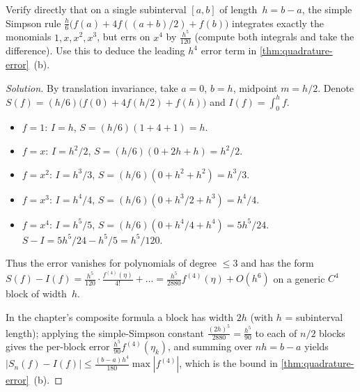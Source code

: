 \begin{problem}
\label{prob:simpson-precision}
Verify directly that on a single subinterval $[a, b]$ of length~$h = b - a$,
the simple Simpson rule
$\tfrac{h}{6}\bigl(f(a) + 4 f((a + b)/2) + f(b)\bigr)$ integrates
exactly the monomials $1, x, x^2, x^3$, but errs on $x^4$ by
$\tfrac{h^5}{120}$ (compute both integrals and take the difference).
Use this to deduce the leading $h^4$ error term in
\cref{thm:quadrature-error}~(b).
\end{problem}

\begin{proof}[Solution]
By translation invariance, take $a = 0$, $b = h$, midpoint $m = h/2$.
Denote $S(f) = (h/6)\bigl(f(0) + 4 f(h/2) + f(h)\bigr)$ and
$I(f) = \int_0^h f$.
\begin{itemize}
  \item $f = 1$: $I = h$, $S = (h/6)(1 + 4 + 1) = h$.
  \item $f = x$: $I = h^2/2$, $S = (h/6)(0 + 2 h + h) = h^2/2$.
  \item $f = x^2$: $I = h^3/3$, $S = (h/6)(0 + h^2 + h^2) = h^3/3$.
  \item $f = x^3$: $I = h^4/4$, $S = (h/6)(0 + h^3/2 + h^3) = h^4/4$.
  \item $f = x^4$: $I = h^5/5$, $S = (h/6)(0 + h^4/4 + h^4) = 5 h^5/24$.
        $S - I = 5 h^5/24 - h^5/5 = h^5/120$.
\end{itemize}
Thus the error vanishes for polynomials of degree $\le 3$ and has the
form $S(f) - I(f) = \tfrac{h^5}{120} \cdot \tfrac{f^{(4)}(\eta)}{4!} + \dots
= \tfrac{h^5}{2880} f^{(4)}(\eta) + O(h^6)$ on a generic $C^4$ block of
width~$h$.

In the chapter's composite formula a block has width $2 h$ (with $h$ =
subinterval length); applying the simple-Simpson constant
$\tfrac{(2h)^5}{2880} = \tfrac{h^5}{90}$ to each of $n / 2$ blocks gives
the per-block error $\tfrac{h^5}{90} f^{(4)}(\eta_k)$, and summing over
$n h = b - a$ yields
$|S_n(f) - I(f)| \le \tfrac{(b - a) h^4}{180} \max |f^{(4)}|$, which is
the bound in \cref{thm:quadrature-error}~(b).
\end{proof}
